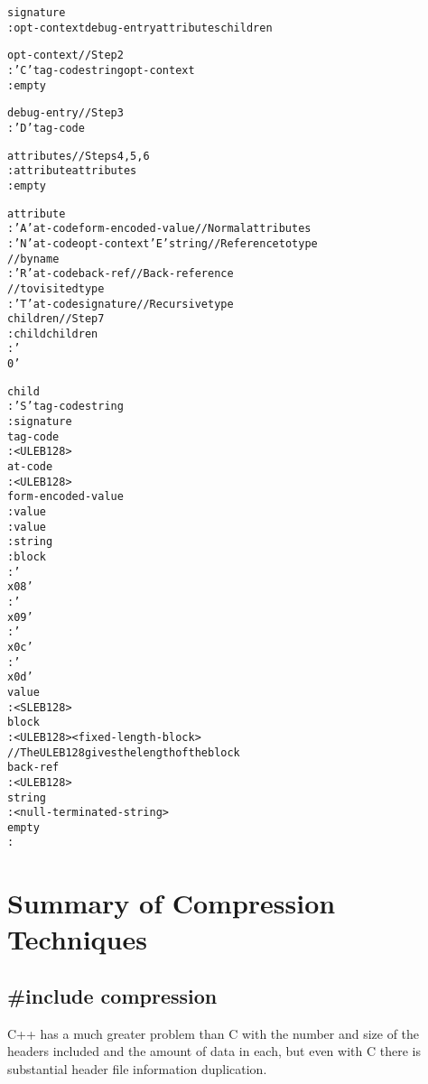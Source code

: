 \begin{alltt}
signature
    : opt-context debug-entry attributes children

opt-context           // Step 2
    : 'C' tag-code string opt-context
    : empty

debug-entry           // Step 3
    : 'D' tag-code

attributes            // Steps 4, 5, 6
    : attribute attributes
    : empty

attribute
    : 'A' at-code form-encoded-value     // Normal attributes
    : 'N' at-code opt-context 'E' string // Reference to type
                                         // by name
    : 'R' at-code back-ref               // Back-reference 
                                         // to visited type
    : 'T' at-code signature              // Recursive type
children             //  Step 7
    : child children
    : '\\0'

child
    : 'S' tag-code string
    : signature
tag-code
    : <ULEB128>
at-code
    : <ULEB128>
form-encoded-value
    :  value
    :  value
    :  string
    :  block
    : '\\x08'
    : '\\x09'
    : '\\x0c'
    : '\\x0d'
value
    : <SLEB128>
block
    : <ULEB128> <fixed-length-block>
                      // The ULEB128 gives the length of the block
back-ref
    : <ULEB128>
string
    : <null-terminated-string>
empty
    :
\end{alltt}


\section{Summary of Compression Techniques}
\label{app:summaryofcompressiontechniques}
\subsection{\#include compression}
\label{app:includecompression}

C++ has a much greater problem than C with the number and
size of the headers included and the amount of data in each,
but even with C there is substantial header file information
duplication.

